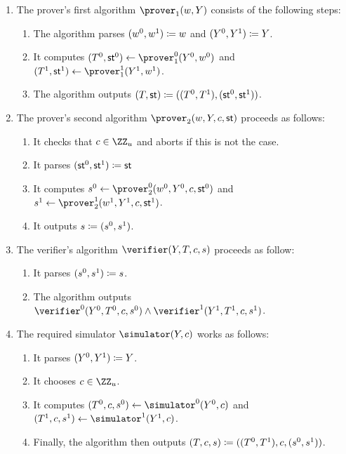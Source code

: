 \documentclass[runningheads]{llncs}
\begin{document}
\begin{enumerate}
  \item
    The prover's first algorithm $\prover_1(w,Y)$ consists of the following steps:
    \begin{enumerate}
      \item
        The algorithm parses $(w^0,w^1)\coloneqq w$ and $(Y^0,Y^1)\coloneqq Y$.
      \item
        It computes $(T^0,\st^0)\gets\prover_1^0(Y^0,w^0)$ and $(T^1,\st^1)\gets\prover_1^1(Y^1,w^1)$.
      \item
	The algorithm outputs $(T,\mathsf{st}) \coloneqq ((T^0,T^1),(\mathsf{st}^0,\mathsf{st}^1))$.
    \end{enumerate}
  \item
    The prover's second algorithm $\prover_2(w,Y,c,\st)$ proceeds as follows:
    \begin{enumerate}
      \item
        It checks that $c\in\ZZ_u$ and aborts if this is not the case.
      \item
	It parses $(\mathsf{st}^0,\mathsf{st}^1)\coloneqq \mathsf{st}$
      \item
        It computes $s^0\gets\prover_2^0(w^0,Y^0,c,\st^0)$ and $s^1\gets\prover_2^1(w^1,Y^1,c,\st^1)$.
      \item
        It outputs $s\coloneqq(s^0,s^1)$.
    \end{enumerate}
  \item
    The verifier's algorithm $\verifier(Y, T,c,s)$ proceeds as follow:
    \begin{enumerate}
      \item
        It  parses $(s^0,s^1)\coloneqq s$.
      \item
	The algorithm outputs $\verifier^0(Y^0,T^0,c,s^0)\land\verifier^1(Y^1,T^1,c,s^1)$.
    \end{enumerate}
  \item
    The required simulator $\simulator(Y,c)$ works as follows:
    \begin{enumerate}
      \item
        It parses $(Y^0,Y^1)\coloneqq Y$.
      \item
        It chooses $c\in\ZZ_u$.
      \item
        It computes $(T^0,c,s^0)\gets\simulator^0(Y^0,c)$ and $(T^1,c,s^1)\gets\simulator^1(Y^1,c)$.
      \item
        Finally, the algorithm then outputs $(T,c,s)\coloneqq((T^0,T^1),c,(s^0,s^1))$.
    \end{enumerate}
\end{enumerate}
\end{document}
